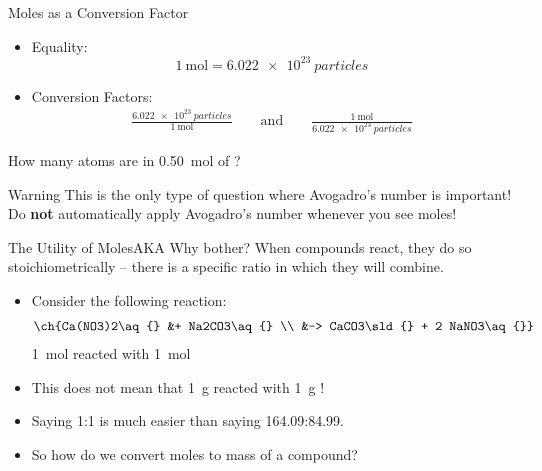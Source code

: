 \documentclass[notes=show]{beamer}
\begin{document}
\begin{frame}{Moles as a Conversion Factor}
	\begin{itemize}
		\item Equality:
			\begin{equation*}
				\SI{1}{\mole} = \SI{6.022e23}{particles}
			\end{equation*}
		\item Conversion Factors:
			\begin{align*}
				\frac{\SI{6.022e23}{particles}}{\SI{1}{\mole}}
				\qquad\text{and}\qquad
				\frac{\SI{1}{\mole}}{\SI{6.022e23}{particles}}
			\end{align*}
	\end{itemize}

	\pause
	\bigskip

	How many  atoms are in \SI{0.50}{\mole} of ?


	\bigskip

	\begin{alertblock}{Warning}
		This is the only type of question where Avogadro's number is
		important! Do \textbf{not} automatically apply Avogadro's number
		whenever you see moles!
	\end{alertblock}
\end{frame}


\begin{frame}{The Utility of Moles}{AKA Why bother?}
	When compounds react, they do so \alert{stoichiometrically}
		-- there is a specific ratio in which they will combine.
		\begin{itemize}[<+(1)->]
			\item Consider the following reaction: %
				\begin{align*}
					\ch{Ca(NO3)2\aq{} &+ Na2CO3\aq{} \\ 
					&->
					CaCO3\sld{} + 2 NaNO3\aq{}}
				\end{align*}
				\alert{\SI{1}{\mole}} 
				reacted with \alert{\SI{1}{\mole}}
			\item This \alert{does not} mean that \SI{1}{\gram}
				 reacted with \SI{1}{\gram}
				!
			\item Saying 1:1 is much easier than saying
				164.09:84.99.
			\item So how do we convert moles to mass of a compound?
		\end{itemize}
\end{frame}
\end{document}

